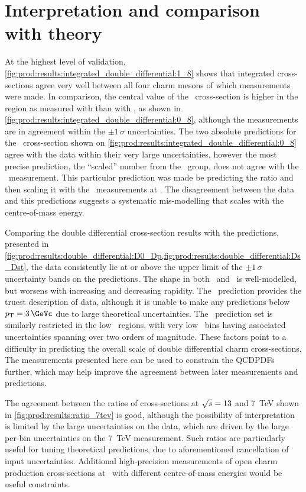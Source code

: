 \section{Interpretation and comparison with theory}
\label{chap:prod:results:discussion}

At the highest level of validation, 
\cref{fig:prod:results:integrated_double_differential:1_8} shows that 
integrated cross-sections agree very well between all four charm mesons of 
which measurements were made.
In comparison, the central value of the \ccbar\ cross-section is higher in the 
 region as measured with \PDzero than with \PDplus, as shown in 
\cref{fig:prod:results:integrated_double_differential:0_8}, although the 
measurements are in agreement within the $\pm1\,\sigma$ uncertainties.
The two absolute predictions for the \ccbar\ cross-section shown on 
\cref{fig:prod:results:integrated_double_differential:0_8} agree with the data 
within their very large uncertainties, however the most precise prediction, the 
``scaled'' number from the \nnpdfl\ group, does not agree with the \lhcb\ 
measurement.
This particular prediction was made be predicting the ratio  
and then scaling it with the \lhcb\ measurements at \sqrtseq{7}.
The disagreement between the data and this predictions suggests a systematic 
mis-modelling that scales with the centre-of-mass energy.

Comparing the double differential cross-section results with the predictions, 
presented in 
\cref{fig:prod:results:double_differential:D0_Dp,fig:prod:results:double_differential:Ds_Dst}, 
the data consistently lie at or above the upper limit of the $\pm1\,\sigma$ 
uncertainty bands on the predictions.
The shape in both \pT\ and \rapidity\ is well-modelled, but worsens with 
increasing \pT and decreasing rapidity.
The \gmvfns\ prediction provides the truest description of data, although it is 
unable to make any predictions below $\pT = \SI{3}{\GeVc}$ due to large 
theoretical uncertainties.
The \fonll\ prediction set is similarly restricted in the low \pT\ regions, 
with very low \pT\ bins having associated uncertainties spanning over two 
orders of magnitude.
These factors point to a difficulty in predicting the overall scale of double 
differential charm cross-sections.
The measurements presented here can be used to constrain the \aclp{QCDPDF} 
further, which may help improve the agreement between later measurements and 
predictions.

The agreement between the ratios of cross-sections at $\sqrt{s} = 13$ and 
\SI{7}{\TeV} shown in \cref{fig:prod:results:ratio_7tev} is good, although the 
possibility of interpretation is limited by the large uncertainties on the 
data, which are driven by the large per-bin uncertainties on the \SI{7}{\TeV} 
measurement.
Such ratios are particularly useful for tuning theoretical predictions, due to 
aforementioned cancellation of input uncertainties.
Additional high-precision measurements of open charm production cross-sections 
at \lhcb\ with different centre-of-mass energies would be useful constraints.

